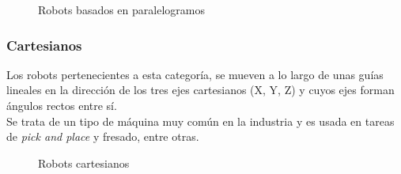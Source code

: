\begin{figure} [ht!]
  \centering    
  \hspace{1cm}
  \caption{Robots basados en paralelogramos}
\end{figure}


\subsubsection{Cartesianos}
Los robots pertenecientes a esta categoría, se mueven a lo largo de unas guías lineales en la dirección de los tres ejes cartesianos (X, Y, Z) y cuyos ejes forman ángulos rectos entre sí. \\
Se trata de un tipo de máquina muy común en la industria y es usada en tareas de \textit{pick and place} y fresado, entre otras.

\begin{figure} [h!]
  \centering    
  \hspace{1cm}
  \caption{Robots cartesianos}
\end{figure}

